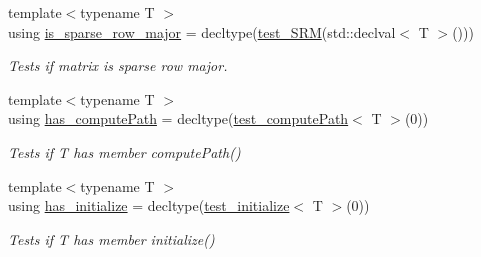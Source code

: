 \begin{DoxyCompactItemize}
{\footnotesize template$<$typename T $>$ }\\using \hyperlink{structMackey_1_1SFINAE_a65dd52a3c2ee8f112260288e6d2f8391}{is\+\_\+sparse\+\_\+row\+\_\+major} = decltype(\hyperlink{structMackey_1_1SFINAE_affbe05b9e94c425333fef47202fd19fc}{test\+\_\+\+S\+RM}(std\+::declval$<$ T $>$()))
\begin{DoxyCompactList}\small\item\em Tests if matrix is sparse row major. \end{DoxyCompactList}\item 
{\footnotesize template$<$typename T $>$ }\\using \hyperlink{structMackey_1_1SFINAE_a970286ad57992a30d8a82eb73c727dec}{has\+\_\+compute\+Path} = decltype(\hyperlink{structMackey_1_1SFINAE_aa8d24c8b8818ab4d1613a127ad14f758}{test\+\_\+compute\+Path}$<$ T $>$(0))
\begin{DoxyCompactList}\small\item\em Tests if T has member compute\+Path() \end{DoxyCompactList}\item 
{\footnotesize template$<$typename T $>$ }\\using \hyperlink{structMackey_1_1SFINAE_a9f27bd555a411026939195401277642d}{has\+\_\+initialize} = decltype(\hyperlink{structMackey_1_1SFINAE_a1734bf7c631d052255bd1d5f96fb0b21}{test\+\_\+initialize}$<$ T $>$(0))
\begin{DoxyCompactList}\small\item\em Tests if T has member initialize() \end{DoxyCompactList}\end{DoxyCompactItemize}
